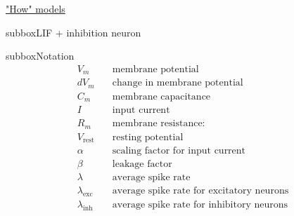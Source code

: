 \begin{textbox}{\href{https://compneuro.neuromatch.io/tutorials/W1D1_ModelTypes/student/W1D1_Tutorial2.html}{"How" models } }
\begin{subbox}{subbox}{LIF + inhibition neuron}
\end{subbox}
\begin{subbox}{subbox}{Notation}
\scriptsize
\begin{align*}
V_m &\quad \text{membrane potential} \\
dV_m &\quad \text{change in membrane potential}\\
C_m &\quad \text{membrane capacitance}\\
I &\quad \text{input current}\\
R_m &\quad \text{membrane resistance}:\\
V_\mathrm{rest} &\quad \text{resting potential}\\
\alpha &\quad \text{scaling factor for input current}\\
\beta &\quad \text{leakage factor}\\
\lambda &\quad \text{average spike rate}\\
\lambda_\mathrm{exc} &\quad \text{average spike rate for excitatory neurons}\\
\lambda_\mathrm{inh} &\quad \text{average spike rate for inhibitory neurons}\\
\end{align*}
\end{subbox}
\end{textbox}
